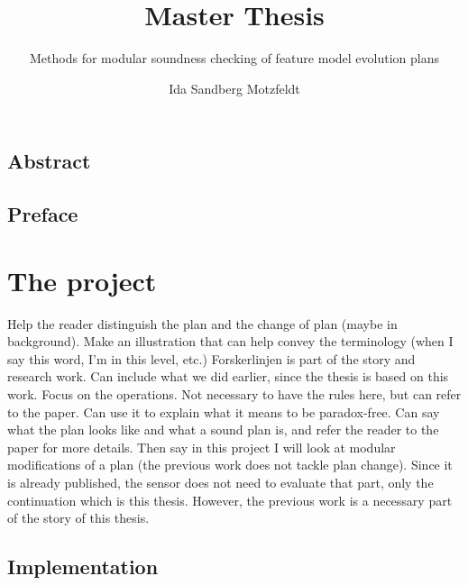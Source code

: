 \documentclass[a4paper,english]{ifimaster}
\title{Master Thesis}
\subtitle{Methods for modular soundness checking of feature model evolution plans}
\author{Ida Sandberg Motzfeldt}
\begin{document}
\duoforside[dept={Department of Informatics},
program={Informatics: Programming and System Architecture},
            option={Software},
long]

\frontmatter{}
\chapter*{Abstract}

\tableofcontents{}
\listoffigures{}
\listoftables{}

\chapter*{Preface}

\mainmatter{}




\part{The project}

Help the reader distinguish the plan and the change of plan (maybe in background). Make an illustration that can help convey the terminology (when I say this word, I'm in this level, etc.)
Forskerlinjen is part of the story and research work. Can include what we did earlier, since the thesis is based on this work. Focus on the operations. Not necessary to have the rules here, but can refer to the paper. Can use it to explain what it means to be paradox-free. Can say what the plan looks like and what a sound plan is, and refer the reader to the paper for more details. Then say in this project I will look at modular modifications of a plan (the previous work does not tackle plan change). Since it is already published, the sensor does not need to evaluate that part, only the continuation which is this thesis. However, the previous work is a necessary part of the story of this thesis.





\chapter{Implementation}  
\end{document}
